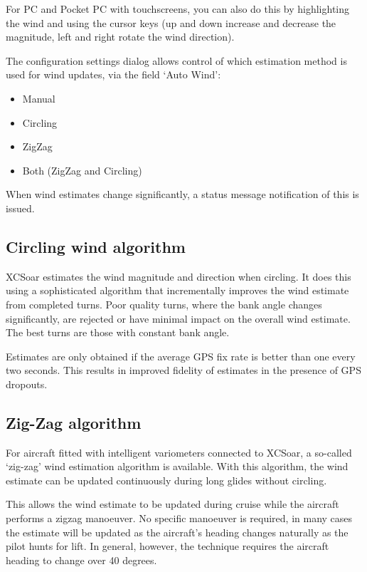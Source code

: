 \documentclass[a4paper,12pt]{refrep}
\begin{document}
For PC and Pocket PC with touchscreens, you can
also do this by highlighting the wind {\InfoBox} and using the cursor
keys (up and down increase and decrease the magnitude, left and right
rotate the wind direction).

The configuration settings dialog allows control of which estimation 
method is used for wind updates, via the field `Auto Wind':
\begin{itemize}
\item Manual
\item Circling
\item ZigZag
\item Both (ZigZag and Circling)
\end{itemize}

When wind estimates change significantly, a status message
notification of this is issued.

\subsection*{Circling wind algorithm}

XCSoar estimates the wind magnitude and direction when circling.  It
does this using a sophisticated algorithm that incrementally improves
the wind estimate from completed turns.  Poor quality turns, where
the bank angle changes significantly, are rejected or have minimal
impact on the overall wind estimate.  The best turns are those with
constant bank angle.

Estimates are only obtained if the average GPS fix rate is better than
one every two seconds.  This results in improved fidelity of estimates
in the presence of GPS dropouts.


\subsection*{Zig-Zag algorithm}

For aircraft fitted with intelligent variometers connected to XCSoar,
a so-called `zig-zag' wind estimation algorithm is available.  With
this algorithm, the wind estimate can be updated continuously during
long glides without circling.

This allows the wind estimate to be updated during cruise while the
aircraft performs a zigzag manoeuver.  No specific manoeuver is
required, in many cases the estimate will be updated as the aircraft's
heading changes naturally as the pilot hunts for lift.  In general,
however, the technique requires the aircraft heading to change over 40
degrees.
\end{document}
